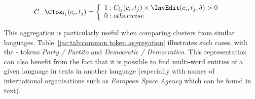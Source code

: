 \documentclass[output=paper]{langsci/langscibook}
\begin{document}
\begin{equation}
C\_\CTok_{l_{1}}(c_i,t_j) =
\left\{
  \begin{array}{lr}
    1 : C_{l_{1}}(c_i,t_j) \times \InvEdit(c_i,t_j,\delta) > 0\\
    0 : otherwise
  \end{array}
\right.
\end{equation}

This aggregation is particularly useful when comparing clusters from
similar languages. Table~\ref{jac:tab:common token aggregation}
illustrates such cases, with the - tokens
\textit{Party / Partito} and \textit{Democratic / Democratico}. This
representation can also benefit from the fact that it is possible to
find multi-word entities of a given language in texts in another
language (especially with names of international organisations such as
\textit{European Space Agency} which can be found in  text).



\label{jac:translated}

\end{document}
